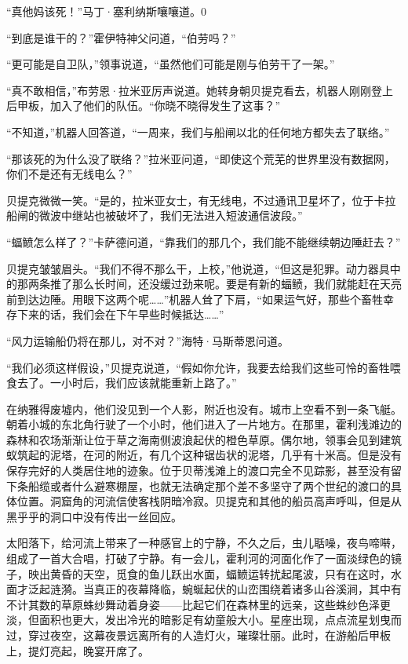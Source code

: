 \documentclass[AutoFakeBold=true]{book}
\begin{document}
``真他妈该死！''马丁·塞利纳斯嚷嚷道。0

``到底是谁干的？''霍伊特神父问道，``伯劳吗？''

``更可能是自卫队，''领事说道，``虽然他们可能是刚与伯劳干了一架。''

``真不敢相信，''布劳恩·拉米亚厉声说道。她转身朝贝提克看去，机器人刚刚登上后甲板，加入了他们的队伍。``你晓不晓得发生了这事？''

``不知道，''机器人回答道，``一周来，我们与船闸以北的任何地方都失去了联络。''

``那该死的为什么没了联络？''拉米亚问道，``即使这个荒芜的世界里没有数据网，你们不是还有无线电么？''

贝提克微微一笑。``是的，拉米亚女士，有无线电，不过通讯卫星坏了，位于卡拉船闸的微波中继站也被破坏了，我们无法进入短波通信波段。''

``蝠鲼怎么样了？''卡萨德问道，``靠我们的那几个，我们能不能继续朝边陲赶去？''

贝提克皱皱眉头。``我们不得不那么干，上校，''他说道，``但这是犯罪。动力器具中的那两条推了那么长时间，还没缓过劲来呢。要是有新的蝠鲼，我们就能赶在天亮前到达边陲。用眼下这两个呢……''机器人耸了下肩，``如果运气好，那些个畜牲幸存下来的话，我们会在下午早些时候抵达……''

``风力运输船仍将在那儿，对不对？''海特·马斯蒂恩问道。

``我们必须这样假设，''贝提克说道，``假如你允许，我要去给我们这些可怜的畜牲喂食去了。一小时后，我们应该就能重新上路了。''

\vspace*{1em}

在纳雅得废墟内，他们没见到一个人影，附近也没有。城市上空看不到一条飞艇。朝着小城的东北角行驶了一个小时，他们进入了一片地方。在那里，霍利浅滩边的森林和农场渐渐让位于草之海南侧波浪起伏的橙色草原。偶尔地，领事会见到建筑蚁筑起的泥塔，在河的附近，有几个这种锯齿状的泥塔，几乎有十米高。但是没有保存完好的人类居住地的迹象。位于贝蒂浅滩上的渡口完全不见踪影，甚至没有留下条船缆或者什么避寒棚屋，也就无法确定那个差不多坚守了两个世纪的渡口的具体位置。洞窟角的河流信使客栈阴暗冷寂。贝提克和其他的船员高声呼叫，但是从黑乎乎的洞口中没有传出一丝回应。

太阳落下，给河流上带来了一种感官上的宁静，不久之后，虫儿聒噪，夜鸟啼啭，组成了一首大合唱，打破了宁静。有一会儿，霍利河的河面化作了一面淡绿色的镜子，映出黄昏的天空，觅食的鱼儿跃出水面，蝠鲼运转扰起尾波，只有在这时，水面才泛起涟漪。当真正的夜幕降临，蜿蜒起伏的山峦围绕着诸多山谷溪涧，其中有不计其数的草原蛛纱舞动着身姿——比起它们在森林里的远亲，这些蛛纱色泽更淡，但面积也更大，发出冷光的暗影足有幼童般大小。星座出现，点点流星划曳而过，穿过夜空，这幕夜景远离所有的人造灯火，璀璨壮丽。此时，在游船后甲板上，提灯亮起，晚宴开席了。
\end{document}
